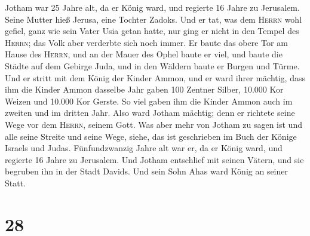  Jotham war 25 Jahre alt, da er König ward, und regierte
16 Jahre zu Jerusalem. Seine Mutter hieß Jerusa, eine Tochter Zadoks.
 Und er tat, was dem \textsc{Herrn} wohl gefiel, ganz wie
sein Vater Usia getan hatte, nur ging er nicht in den Tempel des
\textsc{Herrn}; das Volk aber verderbte sich noch immer. 
Er baute das obere Tor am Hause des \textsc{Herrn}, und an der Mauer des
Ophel baute er viel,  und baute die Städte auf dem Gebirge
Juda, und in den Wäldern baute er Burgen und Türme.  Und
er stritt mit dem König der Kinder Ammon, und er ward ihrer mächtig,
dass ihm die Kinder Ammon dasselbe Jahr gaben 100 Zentner Silber, 10.000
Kor Weizen und 10.000 Kor Gerste. So viel gaben ihm die Kinder Ammon
auch im zweiten und im dritten Jahr.  Also ward Jotham
mächtig; denn er richtete seine Wege vor dem \textsc{Herrn}, seinem
Gott.  Was aber mehr von Jotham zu sagen ist und alle
seine Streite und seine Wege, siehe, das ist geschrieben im Buch der
Könige Israels und Judas.  Fünfundzwanzig Jahre alt war
er, da er König ward, und regierte 16 Jahre zu Jerusalem. 
Und Jotham entschlief mit seinen Vätern, und sie begruben ihn in der
Stadt Davids. Und sein Sohn Ahas ward König an seiner Statt.

\hypertarget{section-27}{%
\section{28}\label{section-27}}

